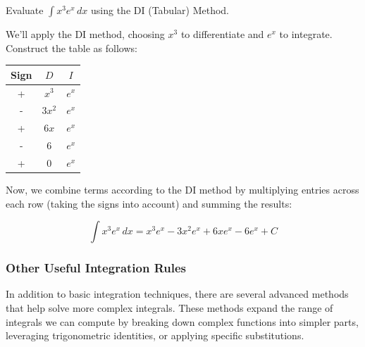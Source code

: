 \exampleline
\begin{example}
Evaluate \( \int x^3 e^x \, dx \) using the DI (Tabular) Method.

\begin{solution}
We’ll apply the DI method, choosing \( x^3 \) to differentiate and \( e^x \) to integrate. Construct the table as follows:

\vspace{1em}
\begin{center}
\begin{tabular}{|c|c|c|}
\hline
Sign & $D$ & $I$ \\
\hline
+ & $x^3$ & $e^x$ \\
- & $3x^2$ & $e^x$ \\
+ & $6x$ & $e^x$ \\
- & $6$ & $e^x$ \\
+ & $0$ & $e^x$ \\
\hline
\end{tabular}
\end{center}
\vspace{1em}

\noindent Now, we combine terms according to the DI method by multiplying entries across each row (taking the signs into account) and summing the results:

\[
\int x^3 e^x \, dx = x^3 e^x - 3x^2 e^x + 6x e^x - 6 e^x + C
\]
\end{solution}
\end{example}
\exampleline




\subsubsection*{Other Useful Integration Rules} 

In addition to basic integration techniques, there are several advanced methods that help solve more complex integrals. These methods expand the range of integrals we can compute by breaking down complex functions into simpler parts, leveraging trigonometric identities, or applying specific substitutions.

